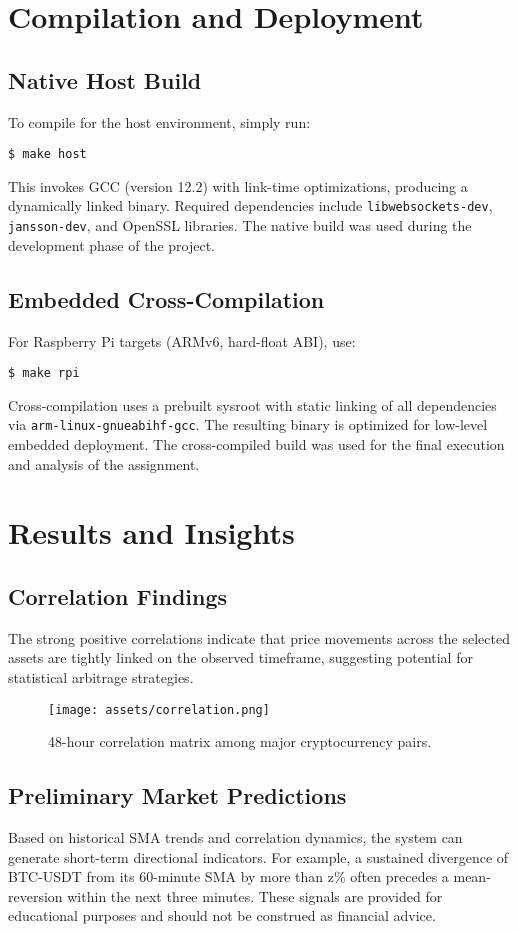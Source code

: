 \documentclass{article}
\begin{document}
\section{Compilation and Deployment}

\subsection{Native Host Build}
To compile for the host environment, simply run:
\begin{verbatim}
$ make host
\end{verbatim}
This invokes GCC (version 12.2) with link-time optimizations, producing a dynamically linked binary. Required dependencies include \texttt{libwebsockets-dev}, \texttt{jansson-dev}, and OpenSSL libraries. The native build was used during the development phase of the project.

\subsection{Embedded Cross-Compilation}
For Raspberry Pi targets (ARMv6, hard-float ABI), use:
\begin{verbatim}
$ make rpi
\end{verbatim}
Cross-compilation uses a prebuilt sysroot with static linking of all dependencies via \texttt{arm-linux-gnueabihf-gcc}. The resulting binary is optimized for low-level embedded deployment. The cross-compiled build was used for the final execution and analysis of the assignment. 

\section{Results and Insights}

\subsection{Correlation Findings}
The strong positive correlations indicate that price movements across the selected assets are tightly linked on the observed timeframe, suggesting potential for statistical arbitrage strategies.
\begin{figure}[h]
  \centering
  \texttt{[image: assets/correlation.png]}
  \caption{48-hour correlation matrix among major cryptocurrency pairs.}
\end{figure}

\subsection{Preliminary Market Predictions}
Based on historical SMA trends and correlation dynamics, the system can generate short-term directional indicators. For example, a sustained divergence of BTC-USDT from its 60-minute SMA by more than z\% often precedes a mean-reversion within the next three minutes. These signals are provided for educational purposes and should not be construed as financial advice.
\end{document}
